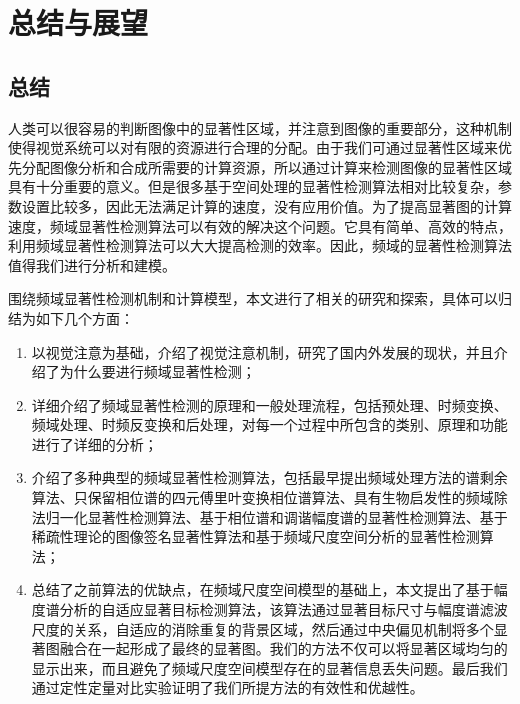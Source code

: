 
\chapter{总结与展望}
\label{cha5}

\section{总结}
\label{5_1}

人类可以很容易的判断图像中的显著性区域，并注意到图像的重要部分，这种机制使得视觉系统可以对有限的资源进行合理的分配。由于我们可通过显著性区域来优先分配图像分析和合成所需要的计算资源，所以通过计算来检测图像的显著性区域具有十分重要的意义。但是很多基于空间处理的显著性检测算法相对比较复杂，参数设置比较多，因此无法满足计算的速度，没有应用价值。为了提高显著图的计算速度，频域显著性检测算法可以有效的解决这个问题。它具有简单、高效的特点，利用频域显著性检测算法可以大大提高检测的效率。因此，频域的显著性检测算法值得我们进行分析和建模。

围绕频域显著性检测机制和计算模型，本文进行了相关的研究和探索，具体可以归结为如下几个方面：
\begin{enumerate}
\item 以视觉注意为基础，介绍了视觉注意机制，研究了国内外发展的现状，并且介绍了为什么要进行频域显著性检测；
\item 详细介绍了频域显著性检测的原理和一般处理流程，包括预处理、时频变换、频域处理、时频反变换和后处理，对每一个过程中所包含的类别、原理和功能进行了详细的分析；
\item 介绍了多种典型的频域显著性检测算法，包括最早提出频域处理方法的谱剩余算法、只保留相位谱的四元傅里叶变换相位谱算法、具有生物启发性的频域除法归一化显著性检测算法、基于相位谱和调谐幅度谱的显著性检测算法、基于稀疏性理论的图像签名显著性算法和基于频域尺度空间分析的显著性检测算法；
\item 总结了之前算法的优缺点，在频域尺度空间模型的基础上，本文提出了基于幅度谱分析的自适应显著目标检测算法，该算法通过显著目标尺寸与幅度谱滤波尺度的关系，自适应的消除重复的背景区域，然后通过中央偏见机制将多个显著图融合在一起形成了最终的显著图。我们的方法不仅可以将显著区域均匀的显示出来，而且避免了频域尺度空间模型存在的显著信息丢失问题。最后我们通过定性定量对比实验证明了我们所提方法的有效性和优越性。
\end{enumerate}


